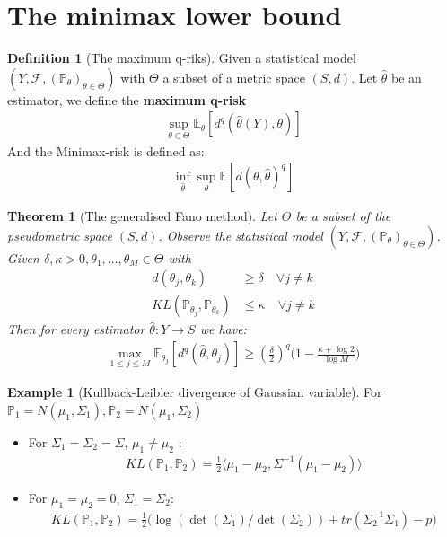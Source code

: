 \documentclass[a4paper,12pt, oneside, fleqn]{book}
\newtheorem{theorem}{Theorem}[section]
\theoremstyle{definition}
\newtheorem{definition}{Definition}[section]
\newtheorem*{example}{Example}
\theoremstyle{remark}
\begin{document}
\section{The minimax lower bound}
\begin{definition}[The maximum q-riks]
Given a statistical model $(Y, \mathcal{F}, (\mathbb{P}_\theta)_{\theta\in \Theta})$ with $\Theta$ a subset of a metric space $(S, d)$. Let $\hat{\theta}$ be an estimator, we define the \textbf{maximum q-risk}
\begin{align*}
	\sup_{\theta \in \Theta} \mathbb{E}_\theta[ d^q(\hat{\theta}(Y), \theta)]
\end{align*}
And the Minimax-risk is defined as:
\begin{align*}
	\inf_{\hat{\theta}} \sup_\theta \mathbb{E}[d(\theta, \hat{\theta})^q]
\end{align*}
\end{definition}

\begin{theorem}[The generalised Fano method]
	Let $\Theta$ be a subset of the pseudometric space $(S, d)$. Observe the statistical model $(Y, \mathcal{F}, (\mathbb{P}_\theta)_{\theta \in \Theta})$. Given $\delta, \kappa > 0, \theta_1, \dots, \theta_M \in \Theta$ with
	\begin{align*}
		d(\theta_j, \theta_k) &\ge \delta \quad \forall j\neq k\\
		KL(\mathbb{P}_{\theta_j}, \mathbb{P}_{\theta_k}) &\le \kappa \quad \forall j\neq k
	\end{align*}
	Then for every estimator $\hat{\theta}: Y \rightarrow S$ we have:
	\begin{align*}
		\max_{1 \le j \le M} \mathbb{E}_{\theta_j}[d^q(\hat{\theta}, \theta_j)] \ge (\frac{\delta}{2})^q \bigg(1 - \frac{\kappa + \log 2}{\log M}\bigg)
	\end{align*}
\end{theorem}

\begin{example}[Kullback-Leibler divergence of Gaussian variable]
For $\mathbb{P}_1 = N(\mu_1, \Sigma_1), \mathbb{P}_2 = N(\mu_1, \Sigma_2)$
\begin{itemize}
	\item For $\Sigma_1 = \Sigma_2 = \Sigma$, $\mu_1 \neq \mu_2$ :
\begin{align*}
	KL(\mathbb{P}_1, \mathbb{P}_2) = \frac{1}{2}\langle \mu_1 - \mu_2, \Sigma^{-1} (\mu_1 - \mu_2)\rangle
\end{align*}
\item For $\mu_1 = \mu_2 = 0$, $\Sigma_1 = \Sigma_2$:
\begin{align*}
	KL( \mathbb{P}_1, \mathbb{P}_2) = \frac{1}{2}\bigg(\log(\det(\Sigma_1) \slash \det( \Sigma_2)) + tr(\Sigma_2^{-1} \Sigma_1) - p \bigg)
\end{align*}
\end{itemize}
	
\end{example}
\end{document}
